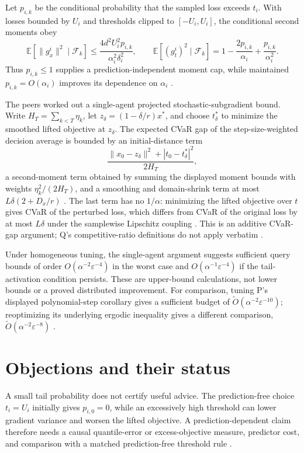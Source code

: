 \documentclass{article}
\begin{document}
Let \(p_{i,k}\) be the conditional probability that the sampled loss exceeds \(t_i\). With losses bounded by \(U_i\) and thresholds clipped to \([-U_i,U_i]\), the conditional second moments obey
\[
\mathbb E[\|g_x^i\|^2\mid\mathcal F_k]
\leq
\frac{4d^2U_i^2p_{i,k}}{\alpha_i^2\delta_i^2},
\qquad
\mathbb E[(g_t^i)^2\mid\mathcal F_k]
=
1-\frac{2p_{i,k}}{\alpha_i}
+\frac{p_{i,k}}{\alpha_i^2}.
\]
Thus \(p_{i,k}\leq 1\) supplies a prediction-independent moment cap, while maintained \(p_{i,k}=O(\alpha_i)\) improves its dependence on \(\alpha_i\) .

The peers worked out a single-agent projected stochastic-subgradient bound. Write \(H_T=\sum_{k<T}\eta_k\), let \(z_\delta=(1-\delta/r)x^\ast\), and choose \(t_\delta^\ast\) to minimize the smoothed lifted objective at \(z_\delta\). The expected CVaR gap of the step-size-weighted decision average is bounded by an initial-distance term
\[
\frac{\|x_0-z_\delta\|^2+|t_0-t_\delta^\ast|^2}{2H_T},
\]
a second-moment term obtained by summing the displayed moment bounds with weights \(\eta_k^2/(2H_T)\), and a smoothing and domain-shrink term at most \(L\delta(2+D_x/r)\) . The last term has no \(1/\alpha\): minimizing the lifted objective over \(t\) gives CVaR of the perturbed loss, which differs from CVaR of the original loss by at most \(L\delta\) under the samplewise Lipschitz coupling . This is an additive CVaR-gap argument; Q's competitive-ratio definitions do not apply verbatim .

Under homogeneous tuning, the single-agent argument suggests sufficient query bounds of order \(O(\alpha^{-2}\varepsilon^{-4})\) in the worst case and \(O(\alpha^{-1}\varepsilon^{-4})\) if the tail-activation condition persists. These are upper-bound calculations, not lower bounds or a proved distributed improvement. For comparison, tuning P's displayed polynomial-step corollary gives a sufficient budget of \(\widetilde O(\alpha^{-2}\varepsilon^{-10})\); reoptimizing its underlying ergodic inequality gives a different comparison, \(\widetilde O(\alpha^{-2}\varepsilon^{-8})\) .

\section{Objections and their status}

A small tail probability does not certify useful advice. The prediction-free choice \(t_i=U_i\) initially gives \(p_{i,0}=0\), while an excessively high threshold can lower gradient variance and worsen the lifted objective. A prediction-dependent claim therefore needs a causal quantile-error or excess-objective measure, predictor cost, and comparison with a matched prediction-free threshold rule .
\end{document}
